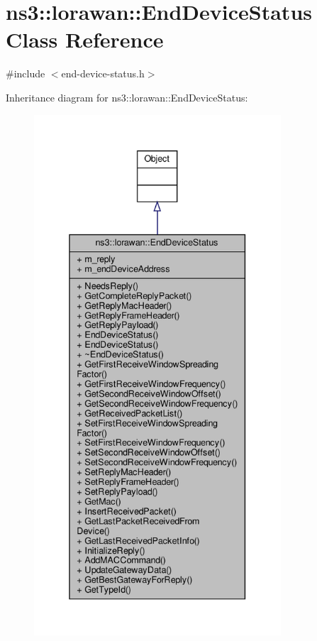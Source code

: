 \hypertarget{classns3_1_1lorawan_1_1EndDeviceStatus}{}\section{ns3\+:\+:lorawan\+:\+:End\+Device\+Status Class Reference}
\label{classns3_1_1lorawan_1_1EndDeviceStatus}


{\ttfamily \#include $<$end-\/device-\/status.\+h$>$}



Inheritance diagram for ns3\+:\+:lorawan\+:\+:End\+Device\+Status\+:
\nopagebreak
\begin{figure}[H]
\begin{center}
\leavevmode
\includegraphics[height=550pt]{classns3_1_1lorawan_1_1EndDeviceStatus__inherit__graph}
\end{center}
\end{figure}


